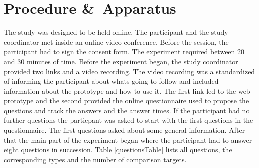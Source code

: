 \section{Procedure \&\ Apparatus}
The study was designed to be held online. The participant and the study coordinator met inside an online video conference. Before the session,
the participant had to sign the consent form. The experiment required between 20 and 30 minutes of time. Before the experiment began, the
study coordinator provided two links and a video recording. The video recording was a standardized of informing the participant about whats
going to follow and included information about the prototype and how to use it. The first link led to the web-prototype and the second
provided the online questionnaire used to propose the questions and track the answers and the answer times. If the participant had no further
questions the particpant was asked to start with the first questions in the questionnaire. The first questions asked about some general
information. After that the main part of the experiment began where the participant had to answer eight questions in succession. Table
\ref{questionsTable} lists all questions, the corresponding types and the number of comparison targets.

